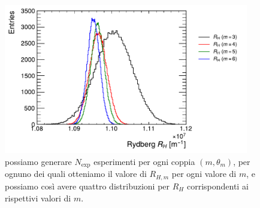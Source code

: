 \documentclass[a4paper,aps,12pt,tightenlines]{revtex4-2}
\begin{document}
\begin{figure}
\centering
\includegraphics[width=10.7cm]{../figures_and_tests/rydberg.pdf}
\caption{possiamo generare $N_\text{exp}$ esperimenti per ogni coppia $(m, \theta_m)$, per ognuno dei quali otteniamo il valore di $R_{H,m}$ per ogni valore di $m$, e possiamo così avere quattro distribuzioni per $R_H$ corrispondenti ai rispettivi valori di $m$. \label{fig:rydberg}}
\end{figure}
\end{document}
